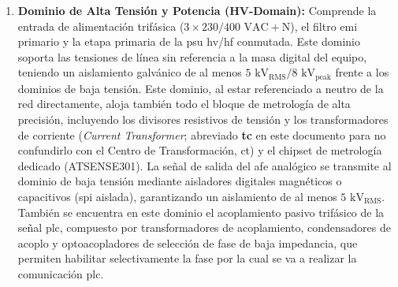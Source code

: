 \begin{enumerate}
    \item \textbf{Dominio de Alta Tensión y Potencia (HV-Domain):} Comprende la entrada de alimentación trifásica ($3\times230/400\text{ VAC} + \text{N}$), el filtro \gls{emi} primario y la etapa primaria de la \gls{psu} \gls{hv}/\gls{hf} conmutada. Este dominio soporta las tensiones de línea sin referencia a la masa digital del equipo, teniendo un aislamiento galvánico de al menos $5\text{ kV}_{\text{RMS}}/8\text{ kV}_{\text{peak}}$ frente a los dominios de baja tensión. Este dominio, al estar referenciado a neutro de la red directamente, aloja también todo el bloque de metrología de alta precisión, incluyendo los divisores resistivos de tensión y los transformadores de corriente (\textit{Current Transformer}; abreviado \textbf{\gls{tc}} en este documento para no confundirlo con el Centro de Transformación, \gls{ct}) y el chipset de metrología dedicado (ATSENSE301). La señal de salida del \gls{afe} analógico se transmite al dominio de baja tensión mediante aisladores digitales magnéticos o capacitivos (\gls{spi} aislada), garantizando un aislamiento de al menos $5\text{ kV}_{\text{RMS}}$. También se encuentra en este dominio el acoplamiento pasivo trifásico de la señal \gls{plc}, compuesto por transformadores de acoplamiento, condensadores de acoplo y optoacopladores de selección de fase de baja impedancia, que permiten habilitar selectivamente la fase por la cual se va a realizar la comunicación \gls{plc}.

\end{enumerate}
